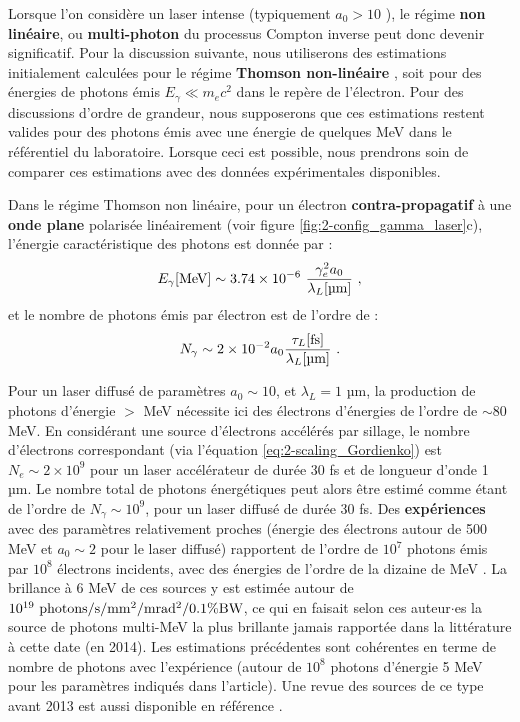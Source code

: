 \begin{refsection}
Lorsque l'on considère un laser intense (typiquement $a_0>10$ \parencite{corde_2013a}), le régime \textbf{non linéaire}, ou \textbf{multi-photon} du processus Compton inverse peut donc devenir significatif. Pour la discussion suivante, nous utiliserons des estimations initialement calculées pour le régime \textbf{Thomson non-linéaire} \parencite{corde_2013a}, soit pour des énergies de photons émis $E_\gamma \ll m_e c^2$ dans le repère de l'électron. Pour des discussions d'ordre de grandeur, nous supposerons que ces estimations restent valides pour des photons émis avec une énergie de quelques MeV dans le référentiel du laboratoire. Lorsque ceci est possible, nous prendrons soin de comparer ces estimations avec des données expérimentales disponibles. 

Dans le régime Thomson non linéaire, pour un électron \textbf{contra-propagatif} à une \textbf{onde plane} polarisée linéairement (voir figure \ref{fig:2-config_gamma_laser}c), l'énergie caractéristique des photons est donnée par \parencite{corde_2013a} :
\begin{equation}
    E_\gamma \si{[\MeV]} \sim 3.74 \times 10^{-6} ~ \dfrac{\gamma_e^2 a_0}{\lambda_L \si{[\um]}} ~ \rm ,
\end{equation}
et le nombre de photons émis par électron est de l'ordre de \parencite{corde_2013a} :
\begin{equation}
    N_\gamma \sim 2 \times 10^{-2} a_0 \dfrac{\tau_L \si{[\fs]}}{\lambda_L \si{[\um]}} ~ \rm .
\end{equation}

Pour un laser diffusé de paramètres $a_0  \sim 10$, et $\lambda_L=1$ µm, la production de photons d'énergie $>$ MeV nécessite ici des électrons d'énergies de l'ordre de $\sim 80$ MeV. En considérant une source d'électrons accélérés par sillage, le nombre d'électrons correspondant (via l'équation \ref{eq:2-scaling_Gordienko}) est $N_e \sim 2 \times 10^{9}$ pour un laser accélérateur de durée 30 fs et de longueur d'onde 1 µm. Le nombre total de photons énergétiques peut alors être estimé comme étant de l'ordre de $N_\gamma \sim 10^{9}$, pour un laser diffusé de durée 30 fs. 
Des \textbf{expériences} avec des paramètres relativement proches (énergie des électrons autour de 500 MeV et $a_0 \sim 2$ pour le laser diffusé) rapportent de l'ordre de $10^{7}$ photons émis par $10^8$ électrons incidents, avec des énergies de l'ordre de la dizaine de MeV \parencite{sarri_2014}. La brillance à 6 MeV de ces sources y est estimée autour de $10^{19} ~ \rm photons /s/mm^2/mrad^2/0.1\%BW$, ce qui en faisait selon ces auteur$\cdot$es la source de photons multi-MeV la plus brillante jamais rapportée dans la littérature à cette date (en 2014). 
Les estimations précédentes sont cohérentes en terme de nombre de photons avec l'expérience (autour de $10^8$ photons d'énergie 5 MeV pour les paramètres indiqués dans l'article). Une revue des sources de ce type avant 2013 est aussi disponible en référence \parencite{corde_2013a}.


\end{refsection}

